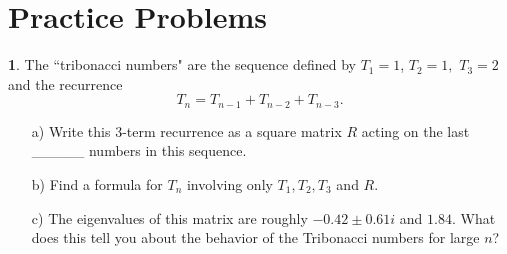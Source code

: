 \documentclass{article}
\theoremstyle{definition}
\newtheorem{prob}{}
\begin{document}
\section*{Practice Problems}

\begin{prob}
	The ``tribonacci numbers" are the sequence defined by $T_1=1$, $T_2=1,$ $T_3=2$ and the recurrence
	\[T_n=T_{n-1}+ T_{n-2}+ T_{n-3}.\]
	\begin{itemize}
		\item[a)] Write this 3-term recurrence as a square matrix $R$ acting on the last \_\_\_\_\_ numbers in this sequence. 
		\item[b)] Find a formula for $T_n$ involving only $T_1, T_2, T_3$ and $R$.
		\item[c)] The eigenvalues of this matrix are roughly $-0.42 \pm 0.61 i$ and $1.84$. What does this tell you about the behavior of the Tribonacci numbers for large $n$?
	\end{itemize}

\end{prob}
\end{document}
